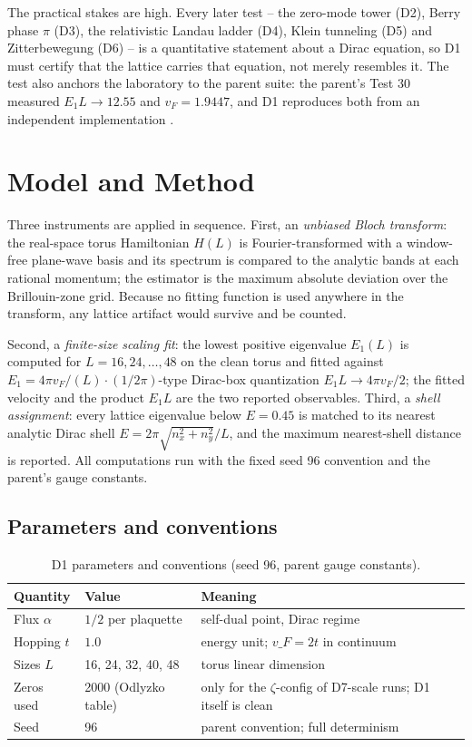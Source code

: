 \documentclass[11pt,a4paper]{article}
\begin{document}
The practical stakes are high. Every later test -- the zero-mode tower (D2), Berry phase $\pi$ (D3), the relativistic Landau ladder (D4), Klein tunneling (D5) and Zitterbewegung (D6) -- is a quantitative statement about a Dirac equation, so D1 must certify that the lattice carries that equation, not merely resembles it. The test also anchors the laboratory to the parent suite: the parent's Test 30 measured $E_1 L \to 12.55$ and $v_F = 1.9447$, and D1 reproduces both from an independent implementation \cite{parent}.

\section{Model and Method}
Three instruments are applied in sequence. First, an \emph{unbiased Bloch transform}: the real-space torus Hamiltonian $H(L)$ is Fourier-transformed with a window-free plane-wave basis and its spectrum is compared to the analytic bands at each rational momentum; the estimator is the maximum absolute deviation over the Brillouin-zone grid. Because no fitting function is used anywhere in the transform, any lattice artifact would survive and be counted.

Second, a \emph{finite-size scaling fit}: the lowest positive eigenvalue $E_1(L)$ is computed for $L = 16, 24, \dots, 48$ on the clean torus and fitted against $E_1 = 4\pi v_F/(L) \cdot (1/2\pi)$-type Dirac-box quantization $E_1 L \to 4\pi v_F/2$; the fitted velocity and the product $E_1 L$ are the two reported observables. Third, a \emph{shell assignment}: every lattice eigenvalue below $E=0.45$ is matched to its nearest analytic Dirac shell $E = 2\pi\sqrt{n_x^2+n_y^2}/L$, and the maximum nearest-shell distance is reported. All computations run with the fixed seed 96 convention and the parent's gauge constants.

\subsection{Parameters and conventions}
\begin{table}[htbp]\centering\small
\begin{tabularx}{\columnwidth}{@{}l l X@{}}
\toprule
Quantity & Value & Meaning \\
\midrule
Flux $\alpha$ & $1/2$ per plaquette & self-dual point, Dirac regime \\
Hopping $t$ & $1.0$ & energy unit; $v\_F = 2t$ in continuum \\
Sizes $L$ & 16, 24, 32, 40, 48 & torus linear dimension \\
Zeros used & 2000 (Odlyzko table) & only for the $\zeta$-config of D7-scale runs; D1 itself is clean \\
Seed & 96 & parent convention; full determinism \\
\bottomrule
\end{tabularx}
\caption{D1 parameters and conventions (seed 96, parent gauge constants).}
\end{table}
\end{document}
